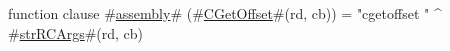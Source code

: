 function clause #\hyperref[sailMIPSzassembly]{assembly}# (#\hyperref[sailMIPSzCGetOffset]{CGetOffset}#(rd, cb)) = "cgetoffset " ^ #\hyperref[sailMIPSzstrRCArgs]{strRCArgs}#(rd, cb)
